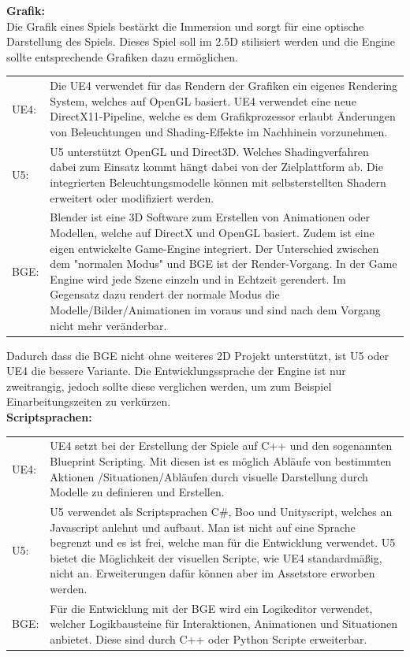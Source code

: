 \textbf{Grafik:}\\
Die Grafik eines Spiels bestärkt die Immersion und sorgt für eine optische Darstellung des Spiels. Dieses Spiel soll im 2.5D stilisiert werden und die Engine sollte entsprechende Grafiken dazu ermöglichen.
\begin{table}[H]
\centering
\begin{tabular}{lp{14.5cm}}

\ac{UE4}:&
Die \ac{UE4} verwendet für das Rendern der Grafiken ein eigenes Rendering System, welches auf OpenGL basiert. \ac{UE4} verwendet eine neue DirectX11-Pipeline, welche es dem Grafikprozessor erlaubt Änderungen von Beleuchtungen und Shading-Effekte im Nachhinein vorzunehmen.\\
\ac{U5}: &
\ac{U5} unterstützt OpenGL und Direct3D. Welches Shadingverfahren dabei zum Einsatz kommt hängt dabei von der  Zielplattform ab. Die integrierten Beleuchtungsmodelle können mit selbsterstellten Shadern erweitert oder modifiziert werden.\\
\ac{BGE}:&
Blender ist eine 3D Software zum Erstellen von Animationen oder Modellen, welche auf DirectX und OpenGL basiert. Zudem ist eine eigen entwickelte Game-Engine integriert. Der Unterschied zwischen dem "normalen Modus" und \ac{BGE} ist der Render-Vorgang. In der Game Engine wird jede Szene einzeln und in Echtzeit gerendert. Im Gegensatz dazu rendert der normale Modus die Modelle/Bilder/Animationen im voraus und sind nach dem Vorgang nicht mehr veränderbar.
\end{tabular}
\end{table}
Dadurch dass die \ac{BGE} nicht ohne weiteres 2D Projekt unterstützt, ist \ac{U5} oder \ac{UE4} die bessere Variante.
Die Entwicklungssprache der Engine ist nur zweitrangig, jedoch sollte diese verglichen werden, um zum Beispiel Einarbeitungszeiten zu verkürzen.\\

\textbf{Scriptsprachen:}
\begin{table}[H]
\centering
\begin{tabular}{lp{14.5cm}}
\ac{UE4}:&
\ac{UE4} setzt bei der Erstellung der Spiele auf C++  und den sogenannten Blueprint Scripting. Mit diesen ist es möglich Abläufe von bestimmten Aktionen /Situationen/Abläufen durch visuelle Darstellung durch Modelle zu definieren und Erstellen.\\
\ac{U5}:&
\ac{U5} verwendet als Scriptsprachen C\#, Boo und Unityscript, welches an Javascript anlehnt und aufbaut. Man ist nicht auf eine Sprache begrenzt und es ist frei, welche man für die Entwicklung verwendet. \ac{U5} bietet die Möglichkeit der visuellen Scripte, wie \ac{UE4} standardmäßig, nicht an. Erweiterungen dafür können aber im Assetstore erworben werden.\\

\ac{BGE}:&
Für die Entwicklung mit der \ac{BGE} wird ein Logikeditor verwendet, welcher Logikbausteine für Interaktionen, Animationen und Situationen anbietet. Diese sind durch C++ oder Python Scripte erweiterbar.

\end{tabular}
\end{table}

